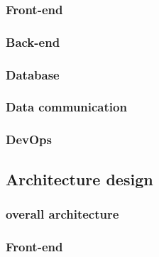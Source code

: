\documentclass{article}
\begin{document}
            \subsubsection{Front-end}
            
            
            \subsubsection{Back-end}
            
            
            \subsubsection{Database}
            
            
            \subsubsection{Data communication}
            
            
            \subsubsection{DevOps}
            

    \subsection{Architecture design}

        
        \subsubsection{overall architecture}
        

        \subsubsection{Front-end}
        
\end{document}
